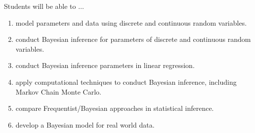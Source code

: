 \documentclass[11pt,onecolumn]{article}
\begin{document}
Students will be able to $\ldots$

\begin{enumerate}
  \itemsep0em

\item model parameters and data using discrete and continuous random variables.
\item conduct Bayesian inference for parameters of discrete and continuous random variables.
\item conduct Bayesian inference parameters in linear regression.
\item apply computational techniques to conduct Bayesian inference, including Markov Chain Monte Carlo.
\item compare Frequentist/Bayesian approaches in statistical inference.
\item develop a Bayesian model for real world data.

\end{enumerate}
\end{document}
